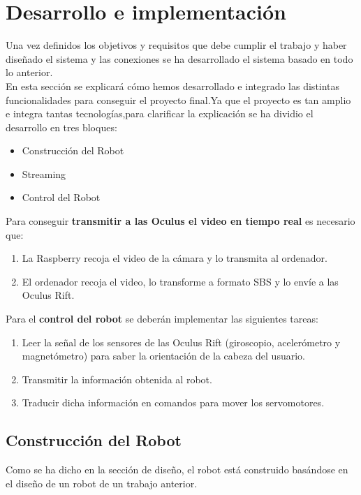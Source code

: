 \documentclass[twoside, 11pt]{epstfg}
\begin{document}
\newpage
\chapter{Desarrollo e implementación}

Una vez definidos los objetivos y requisitos que debe cumplir el trabajo y haber diseñado el sistema y las conexiones se ha desarrollado el sistema basado en todo lo anterior.\\
En esta sección se explicará cómo hemos desarrollado e integrado las distintas funcionalidades para conseguir el proyecto final.Ya que el proyecto es tan amplio e integra tantas tecnologías,para clarificar la explicación se ha dividio el desarrollo en tres bloques:
\begin{itemize}
	\item Construcción del Robot
	\item Streaming 
	\item Control del Robot
\end{itemize}
Para conseguir \textbf{transmitir a las Oculus el video en tiempo real} es necesario que:
\begin{enumerate}
	\item La Raspberry recoja el video de la cámara y lo transmita al ordenador.
	
	\item El ordenador recoja el video, lo transforme a formato SBS y lo envíe a las Oculus Rift. 
	
\end{enumerate}





Para el \textbf{control del robot} se deberán implementar las siguientes tareas:

\begin{enumerate}
	\item Leer la señal de los sensores de las Oculus Rift (giroscopio, acelerómetro y magnetómetro) para saber la orientación de la cabeza del usuario.
	
	\item Transmitir la información obtenida al robot.
	
	\item Traducir dicha información en comandos para mover los servomotores.
\end{enumerate} 
\section{Construcción del Robot}
Como se ha dicho en la sección de diseño, el robot está construido basándose en el diseño de un robot de un trabajo anterior.
\end{document}
